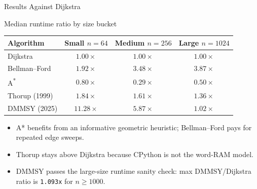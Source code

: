 \documentclass[aspectratio=169]{beamer}
\begin{document}
\begin{frame}{Results Against Dijkstra}
  \footnotesize
  \begin{block}{Median runtime ratio by size bucket}
    \begin{center}
    \begin{tabular}{lccc}
      \hline
      Algorithm & Small $n=64$ & Medium $n=256$ & Large $n=1024$ \\
      \hline
      Dijkstra & $1.00\times$ & $1.00\times$ & $1.00\times$ \\
      Bellman--Ford & $1.92\times$ & $3.48\times$ & $3.87\times$ \\
      A\textsuperscript{*} & $0.80\times$ & $0.29\times$ & $0.50\times$ \\
      Thorup (1999) & $1.84\times$ & $1.61\times$ & $1.36\times$ \\
      DMMSY (2025) & $11.28\times$ & $5.87\times$ & $1.02\times$ \\
      \hline
    \end{tabular}
    \end{center}
  \end{block}

  \begin{itemize}
    \item A* benefits from an informative geometric heuristic; Bellman--Ford pays for repeated edge sweeps.
    \item Thorup stays above Dijkstra because CPython is not the word-RAM model.
    \item DMMSY passes the large-size runtime sanity check: max DMMSY/Dijkstra ratio is \texttt{1.093x} for $n \ge 1000$.
  \end{itemize}
\end{frame}
\end{document}
